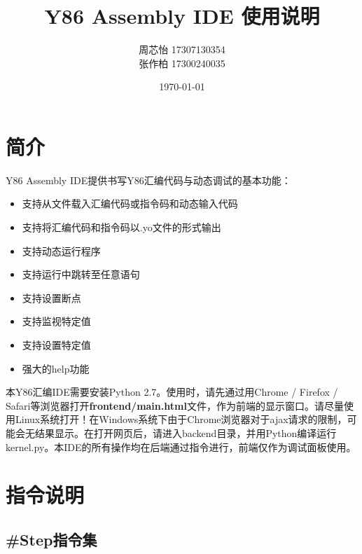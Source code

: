 \documentclass[12pt]{article} %
\title{\textbf{Y86 Assembly IDE 使用说明}}
\author{周芯怡 17307130354\\张作柏 17300240035}
\date{\today}
\begin{document}
\begin{sloppypar}
\maketitle

\section{简介}

Y86 Assembly IDE提供书写Y86汇编代码与动态调试的基本功能：
\begin{itemize}
\item 支持从文件载入汇编代码或指令码和动态输入代码
\item 支持将汇编代码和指令码以.yo文件的形式输出
\item 支持动态运行程序
\item 支持运行中跳转至任意语句
\item 支持设置断点
\item 支持监视特定值
\item 支持设置特定值
\item 强大的help功能
\end{itemize}

本Y86汇编IDE需要安装Python 2.7。使用时，请先通过用Chrome / Firefox / Safari等浏览器打开{\bf frontend/main.html}文件，作为前端的显示窗口。请尽量使用Linux系统打开！在Windows系统下由于Chrome浏览器对于ajax请求的限制，可能会无结果显示。在打开网页后，请进入backend目录，并用Python编译运行kernel.py。本IDE的所有操作均在后端通过指令进行，前端仅作为调试面板使用。

\clearpage
\section{指令说明}

\subsection{\#Step指令集}


\end{sloppypar}
\end{document}
